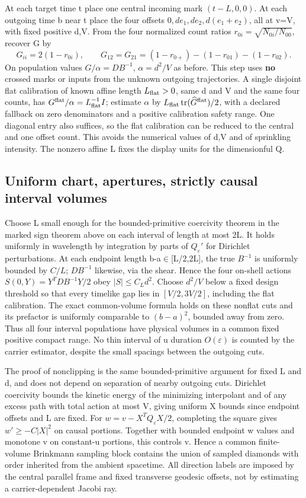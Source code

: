 \documentclass[11pt]{article}
\begin{document}
At each target time t place one central incoming mark \((t-L,0,0)\). At each outgoing time b near t place the four offsets \(0,de_1,de_2,d(e_1+e_2)\), all at v=V, with fixed positive d,V. From the four normalized count ratios \(r_{0i}=\sqrt{N_{0i}/N_{00}}\), recover G by
\[
 G_{ii}=2(1-r_{0i}),\qquad
 G_{12}=G_{21}=(1-r_{0+})-(1-r_{01})-(1-r_{02}).
\]
On population values \(G/\alpha=DB^{-1}\), \(\alpha=d^2/V\) as before. This step uses \textbf{no} crossed marks or inputs from the unknown outgoing trajectories. A single disjoint flat calibration of known affine length \(L_{\rm flat}>0\), same d and V and the same four counts, has \(G^{\rm flat}/\alpha=L_{\rm flat}^{-1}I\); estimate \(\alpha\) by \(L_{\rm flat}\operatorname{tr}(\widehat G^{\rm flat})/2\), with a declared fallback on zero denominators and a positive calibration safety range. One diagonal entry also suffices, so the flat calibration can be reduced to the central and one offset count. This avoids the numerical values of d,V and of sprinkling intensity. The nonzero affine L fixes the display units for the dimensionful Q.

\subsection{Uniform chart, apertures, strictly causal interval volumes}\label{uniform-chart-apertures-strictly-causal-interval-volumes}

Choose L small enough for the bounded-primitive coercivity theorem in the marked sign theorem above on each interval of length at most 2L. It holds uniformly in wavelength by integration by parts of \(Q_\varepsilon'\) for Dirichlet perturbations. At each endpoint length b-a\(\in\){[}L/2,2L{]}, the true \(B^{-1}\) is uniformly bounded by \(C/L\); \(D B^{-1}\) likewise, via the shear. Hence the four on-shell actions \(S(0,Y)=Y^T D B^{-1}Y/2\) obey \(|S|\le C_L d^2\). Choose \(d^2/V\) below a fixed design threshold so that every timelike gap lies in \([V/2,3V/2]\), including the flat calibration. The exact common-volume formula holds on these nonflat cuts and its prefactor is uniformly comparable to \((b-a)^2\), bounded away from zero. Thus all four interval populations have physical volumes in a common fixed positive compact range. No thin interval of u duration \(O(\varepsilon)\) is counted by the carrier estimator, despite the small spacings between the outgoing cuts.

The proof of nonclipping is the same bounded-primitive argument for fixed L and d, and does not depend on separation of nearby outgoing cuts. Dirichlet coercivity bounds the kinetic energy of the minimizing interpolant and of any excess path with total action at most V, giving uniform X bounds since endpoint offsets and L are fixed. For \(w=v-X^TQ_\varepsilon X/2\), completing the square gives \(w'\ge-C|X|^2\) on causal portions. Together with bounded endpoint w values and monotone v on constant-u portions, this controls v. Hence a common finite-volume Brinkmann sampling block contains the union of sampled diamonds with order inherited from the ambient spacetime. All direction labels are imposed by the central parallel frame and fixed transverse geodesic offsets, not by estimating a carrier-dependent Jacobi ray.
\end{document}
